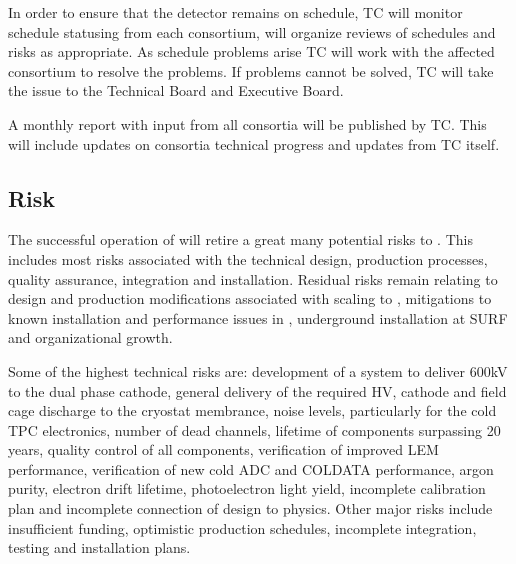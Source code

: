 In order to ensure that the  detector remains on schedule,
TC will monitor schedule statusing from each consortium, will organize
reviews of schedules and risks as appropriate.  As schedule problems
arise TC will work with the affected consortium to resolve the
problems. If problems cannot be solved, TC will take the issue to the
Technical Board and Executive Board.

A monthly report with input from all consortia will be published by
TC. This will include updates on consortia technical progress and
updates from TC itself.


\subsection{Risk}
\label{sec:fdsp-coord-risk}

The successful operation of  will retire a great many
potential risks to . This includes most risks associated with the
technical design, production processes, quality assurance, integration
and installation. Residual risks remain relating to design and
production modifications associated with scaling to , mitigations
to known installation and performance issues in , underground
installation at SURF and organizational growth.

Some of the highest technical risks are: development of a system to
deliver 600kV to the dual phase cathode, general delivery of the
required HV, cathode and field cage discharge to the cryostat
membrance, noise levels, particularly for the cold TPC electronics,
number of dead channels, lifetime of components surpassing 20 years,
quality control of all components, verification of improved LEM
performance, verification of new cold ADC and COLDATA performance,
argon purity, electron drift lifetime, photoelectron light yield,
incomplete calibration plan and incomplete connection of design to
physics. Other major risks include insufficient funding, optimistic
production schedules, incomplete integration, testing and installation
plans.

